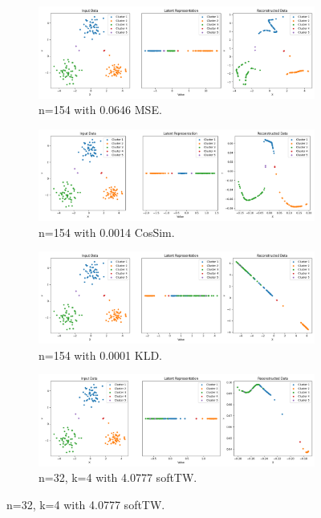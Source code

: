 \begin{figure}[htbp]
  \centering
  \begin{subfigure}[b]{1.0\textwidth}
    \centering
    \includegraphics[width=\linewidth]{images/RQ2/mse/2DBlobsM_-1_0.0646.png}
    \caption{n=154 with 0.0646 MSE.}
    \label{fig:RQ2/mse/2DBlobsM}
  \end{subfigure}
  \hfill
  \begin{subfigure}[b]{1.0\textwidth}
    \centering
    \includegraphics[width=\linewidth]{images/RQ2/csi/2DBlobsM_-1_0.0014.png}
    \caption{n=154 with 0.0014 CosSim.}
    \label{fig:RQ2/csi/2DBlobsM}
  \end{subfigure}
  \hfill
  \begin{subfigure}[b]{1.0\textwidth}
    \centering
    \includegraphics[width=\linewidth]{images/RQ2/kld/2DBlobsM_-1_0.0001.png}
    \caption{n=154 with 0.0001 KLD.}
    \label{fig:RQ2/kld/2DBlobsM}
  \end{subfigure}
  \hfill
  \begin{subfigure}[b]{1.0\textwidth}
    \centering
    \includegraphics[width=\linewidth]{images/RQ2/tru/2DBlobsM_32n_4k_4.0777.png}
    \caption{n=32, k=4 with 4.0777 softTW.}
    \label{fig:RQ2/tru/2DBlobsM}
  \end{subfigure}


\end{figure}
